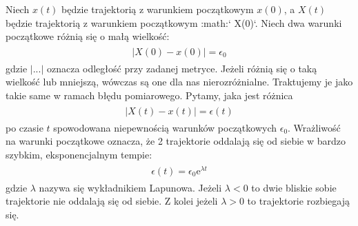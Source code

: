 \documentclass[a4paper,12pt,polish]{sphinxmanual}
\begin{document}
Niech $x(t)$  będzie trajektorią z warunkiem początkowym $x(0)$, a $X(t)$  będzie trajektorią z warunkiem początkowym :math:{}` X(0){}`.   Niech dwa warunki początkowe różnią się o małą wielkość:
\label{ch2/chII012:equation-eqn1}\begin{gather}
\begin{split}|X(0) - x(0)| = \epsilon_0\end{split}\label{ch2/chII012-eqn1}
\end{gather}
gdzie $| ... |$ oznacza odległość przy zadanej metryce.  Jeżeli różnią się o taką wielkość lub mniejszą, wówczas są one  dla nas nierozróżnialne. Traktujemy je jako takie same w ramach błędu pomiarowego. Pytamy, jaka jest różnica
\label{ch2/chII012:equation-eqn2}\begin{gather}
\begin{split}|X(t) - x(t)| = \epsilon(t)\end{split}\label{ch2/chII012-eqn2}
\end{gather}
po czasie $t$ spowodowana niepewnością warunków początkowych $\epsilon_0$. Wrażliwość na warunki początkowe oznacza, że 2 trajektorie oddalają się od siebie w bardzo szybkim, eksponencjalnym tempie:
\label{ch2/chII012:equation-eqn3}\begin{gather}
\begin{split}\epsilon(t) = \epsilon_0  \mbox{e}^{\lambda t}\end{split}\label{ch2/chII012-eqn3}
\end{gather}
gdzie $\lambda$ nazywa się wykładnikiem Lapunowa. Jeżeli $\lambda < 0$ to dwie bliskie sobie trajektorie nie oddalają się od siebie. Z kolei jeżeli $\lambda > 0$ to trajektorie rozbiegają się.
\end{document}
